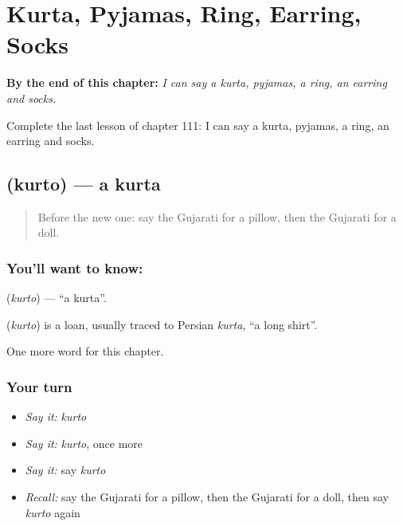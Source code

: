 
\chapter{Kurta, Pyjamas, Ring, Earring, Socks}
\label{ch:gu-kurta-pyjamas-ring-earring-socks}

\begin{chapteropening}
\textbf{By the end of this chapter:} \emph{I can say a kurta, pyjamas, a ring, an earring and socks.}

Complete the last lesson of chapter 111: I can say a kurta, pyjamas, a ring, an earring and socks.
\end{chapteropening}

\section[\texorpdfstring{\gu{કુરતો} (kurto)}{કુરતો (kurto)}]{ (kurto) — a kurta}

\label{lesson:GU-C111-kurto}



\begin{quote}
Before the new one: say the Gujarati for a pillow, then the Gujarati for a doll.
\end{quote}

\subsection*{You'll want to know: }
\textbf{} (\emph{kurto}) — \textquotedblleft{}a kurta\textquotedblright{}.

\begin{cousinweb}
\textbf{} (\emph{kurto}) is a loan, usually traced to Persian \emph{kurta}, \textquotedblleft{}a long shirt\textquotedblright{}.
\end{cousinweb}

\begin{grammarlens}[title={What you've built}]
One more word for this chapter.
\end{grammarlens}

\subsection*{Your turn}
\begin{itemize}
\raggedright
  \item \emph{Say it:} \emph{kurto}
  \item \emph{Say it:} \emph{kurto}, once more
  \item \emph{Say it:} say \emph{kurto}
  \item \emph{Recall:} say the Gujarati for a pillow, then the Gujarati for a doll, then say \emph{kurto} again
\end{itemize}

